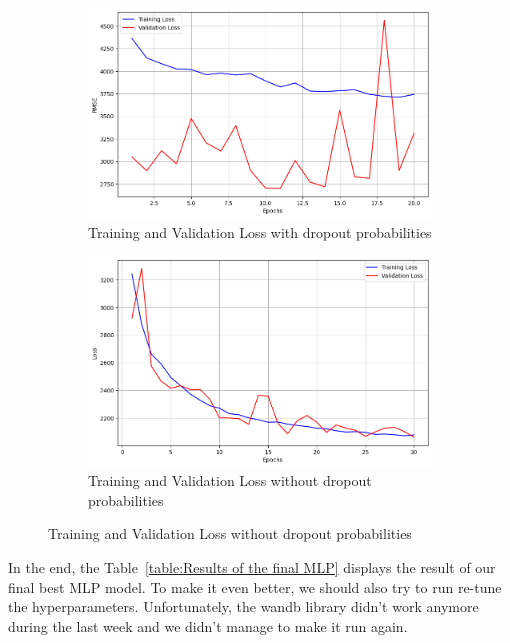 \documentclass[12pt]{article}
\begin{document}
\begin{figure}[!h]
  \centering
  \begin{subfigure}{0.4\textwidth}
    \includegraphics[width=\linewidth]{Training and Validation Loss with dropout probabilities.png}
    \caption{Training and Validation Loss with dropout probabilities}
    \label{Training and Validation Loss with dropout probabilities}
  \end{subfigure}
  \medskip
  \begin{subfigure}{0.4\textwidth}
    \includegraphics[width=\linewidth]{Training and Validation Loss without dropout probabilities.png}
    \caption{Training and Validation Loss without dropout probabilities}
    \label{Training and Validation Loss without dropout probabilities}
  \end{subfigure}
\end{figure}
\FloatBarrier


\noindent In the end, the Table~\ref{table:Results of the final MLP} displays the result of our final best MLP model. To make it even better, we should also try to run re-tune the hyperparameters. Unfortunately, the wandb library didn't work anymore during the last week and we didn't manage to make it run again.
\end{document}
